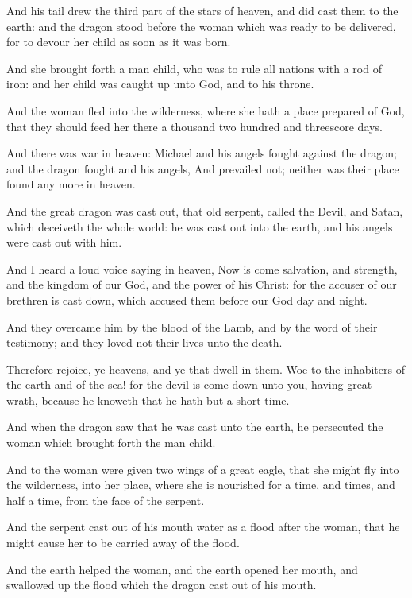 \Verse And his tail drew the third part of the stars of heaven, and did cast them to the earth: and the dragon stood before the woman which was ready to be delivered, for to devour her child as soon as it was born.

\Verse And she brought forth a man child, who was to rule all nations with a rod of iron: and her child was caught up unto God, and to his throne.

\Verse And the woman fled into the wilderness, where she hath a place prepared of God, that they should feed her there a thousand two hundred and threescore days.

\Verse And there was war in heaven: Michael and his angels fought against the dragon; and the dragon fought and his angels, \Verse And prevailed not; neither was their place found any more in heaven.

\Verse And the great dragon was cast out, that old serpent, called the Devil, and Satan, which deceiveth the whole world: he was cast out into the earth, and his angels were cast out with him.

\Verse And I heard a loud voice saying in heaven, Now is come salvation, and strength, and the kingdom of our God, and the power of his Christ: for the accuser of our brethren is cast down, which accused them before our God day and night.

\Verse And they overcame him by the blood of the Lamb, and by the word of their testimony; and they loved not their lives unto the death.

\Verse Therefore rejoice, ye heavens, and ye that dwell in them. Woe to the inhabiters of the earth and of the sea! for the devil is come down unto you, having great wrath, because he knoweth that he hath but a short time.

\Verse And when the dragon saw that he was cast unto the earth, he persecuted the woman which brought forth the man child.

\Verse And to the woman were given two wings of a great eagle, that she might fly into the wilderness, into her place, where she is nourished for a time, and times, and half a time, from the face of the serpent.

\Verse And the serpent cast out of his mouth water as a flood after the woman, that he might cause her to be carried away of the flood.

\Verse And the earth helped the woman, and the earth opened her mouth, and swallowed up the flood which the dragon cast out of his mouth.

